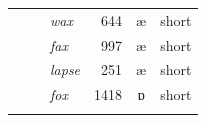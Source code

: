 \begin{table}
\begin{tabular}{lllrcl}
                                                                & ~                                                    & \textit{wax}    & 644       & æ     & short          \\
                                                                & ~                                                    & \textit{fax}    & 997       & æ     & short          \\
                                                                & ~                                                    & \textit{lapse}  & 251       & æ     & short          \\
                                                                & ~                                                    & \textit{fox}    & 1418      & ɒ     & short          \\
\lspbottomrule
\end{tabular}
\end{table}




